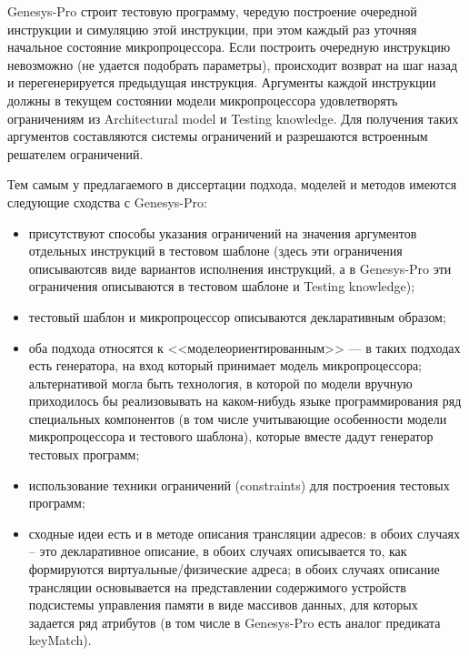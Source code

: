 Genesys-Pro строит тестовую программу, чередую построение очередной инструкции и симуляцию этой инструкции, при этом каждый раз уточняя начальное состояние микропроцессора. Если построить очередную инструкцию невозможно (не удается подобрать параметры), происходит возврат на шаг назад и перегенерируется предыдущая инструкция. Аргументы каждой инструкции должны в текущем состоянии модели микропроцессора удовлетворять ограничениям из Architectural model и Testing knowledge. Для получения таких аргументов составляются системы ограничений и разрешаются встроенным решателем ограничений.


Тем самым у предлагаемого в диссертации подхода, моделей и методов имеются следующие сходства с Genesys-Pro:
\begin{itemize}
    \item присутствуют способы указания ограничений на значения аргументов отдельных инструкций в тестовом шаблоне (здесь эти ограничения описываютсяв  виде вариантов исполнения инструкций, а в Genesys-Pro эти ограничения описываются в тестовом шаблоне и Testing knowledge);
    \item тестовый шаблон и микропроцессор описываются декларативным образом;
    \item оба подхода относятся к <<моделеориентированным>> --- в таких подходах есть генератора, на вход который принимает модель микропроцессора; альтернативой могла быть технология, в которой по модели вручную приходилось бы реализовывать на каком-нибудь языке программирования ряд специальных компонентов (в том числе учитывающие особенности модели микропроцессора и тестового шаблона), которые вместе дадут генератор тестовых программ;
    \item использование техники ограничений (constraints) для построения тестовых программ;
    \item сходные идеи есть и в методе описания трансляции адресов: в обоих случаях -- это декларативное описание, в обоих случаях описывается то, как формируются виртуальные/физические адреса; в обоих случаях описание трансляции основывается на представлении содержимого устройств подсистемы управления памяти в виде массивов данных, для которых задается ряд атрибутов (в том числе в Genesys-Pro есть аналог предиката keyMatch).
\end{itemize}

